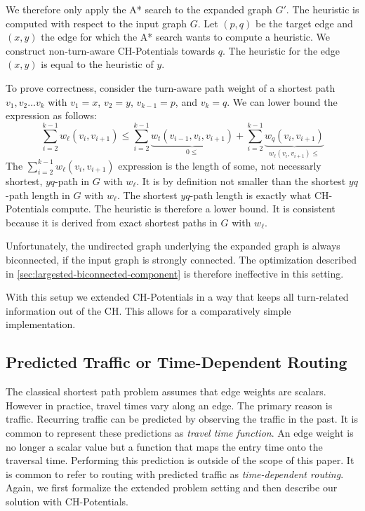 \documentclass[letterpaper]{article} %
\begin{document}
We therefore only apply the A* search to the expanded graph $G'$.
The heuristic is computed with respect to the input graph $G$.
Let $(p,q)$ be the target edge and $(x,y)$ the edge for which the A* search wants to compute a heuristic.
We construct non-turn-aware CH-Potentials towards $q$.
The heuristic for the edge $(x,y)$ is equal to the heuristic of $y$.

To prove correctness, consider the turn-aware path weight of a shortest path $v_1,v_2\ldots v_k$ with $v_1=x$, $v_2=y$, $v_{k-1}=p$, and $v_k=q$.
We can lower bound the expression as follows:
\[
\sum_{i=2}^{k-1} w_\ell(v_i,v_{i+1}) \le \sum_{i=2}^{k-1} \underbrace{w_t(v_{i-1},v_i,v_{i+1})}_{0\le} + \sum_{i=2}^{k-1} \underbrace{w_q(v_i,v_{i+1})}_{w_\ell(v_i,v_{i+1})\le}
\]
The $\sum_{i=2}^{k-1} w_\ell(v_i,v_{i+1})$ expression is the length of some, not necessarly shortest, $yq$-path in $G$ with $w_\ell$.
It is by definition not smaller than the shortest $yq$-path length in $G$ with $w_\ell$.
The shortest $yq$-path length is exactly what CH-Potentials compute.
The heuristic is therefore a lower bound.
It is consistent because it is derived from exact shortest paths in $G$ with $w_\ell$.

Unfortunately, the undirected graph underlying the expanded graph is always biconnected, if the input graph is strongly connected.
The optimization described in \ref{sec:largested-biconnected-component} is therefore ineffective in this setting.

With this setup we extended CH-Potentials in a way that keeps all turn-related information out of the CH.
This allows for a comparatively simple implementation.

\subsection{Predicted Traffic or Time-Dependent Routing}
\label{sec:predicted-traffic}

The classical shortest path problem assumes that edge weights are scalars.
However in practice, travel times vary along an edge.
The primary reason is traffic.
Recurring traffic can be predicted by observing the traffic in the past.
It is common \cite{lots-of-td-papers} to represent these predictions as \emph{travel time function}.
An edge weight is no longer a scalar value but a function that maps the entry time onto the traversal time.
Performing this prediction is outside of the scope of this paper.
It is common to refer to routing with predicted traffic as \emph{time-dependent routing}.
Again, we first formalize the extended problem setting and then describe our solution with CH-Potentials.
\end{document}
